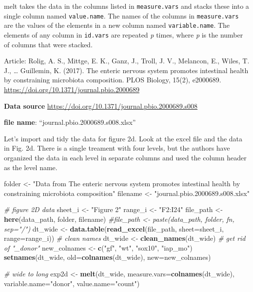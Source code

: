 \documentclass[]{book}
\newenvironment{Shaded}{\begin{snugshade}}{\end{snugshade}}
\newcommand{\KeywordTok}[1]{\textcolor[rgb]{0.13,0.29,0.53}{\textbf{#1}}}
\newcommand{\DataTypeTok}[1]{\textcolor[rgb]{0.13,0.29,0.53}{#1}}
\newcommand{\StringTok}[1]{\textcolor[rgb]{0.31,0.60,0.02}{#1}}
\newcommand{\CommentTok}[1]{\textcolor[rgb]{0.56,0.35,0.01}{\textit{#1}}}
\newcommand{\NormalTok}[1]{#1}
\begin{document}
melt takes the data in the columns listed in \texttt{measure.vars} and
stacks these into a single column named \texttt{value.name}. The names
of the columns in \texttt{measure.vars} are the values of the elements
in a new column named \texttt{variable.name}. The elements of any column
in \texttt{id.vars} are repeated \emph{p} times, where \emph{p} is the
number of columns that were stacked.

Article: Rolig, A. S., Mittge, E. K., Ganz, J., Troll, J. V., Melancon,
E., Wiles, T. J., \ldots{} Guillemin, K. (2017). The enteric nervous
system promotes intestinal health by constraining microbiota
composition. PLOS Biology, 15(2), e2000689.
\url{https://doi.org/10.1371/journal.pbio.2000689}

\textbf{Data source}
\url{https://doi.org/10.1371/journal.pbio.2000689.s008}

\textbf{file name}: ``journal.pbio.2000689.s008.xlsx''

Let's import and tidy the data for figure 2d. Look at the excel file and
the data in Fig. 2d. There is a single treament with four levels, but
the authors have organized the data in each level in separate columns
and used the column header as the level name.

\begin{Shaded}
\begin{Highlighting}[]
\NormalTok{folder <-}\StringTok{ "Data from The enteric nervous system promotes intestinal health by constraining microbiota composition"}
\NormalTok{filename <-}\StringTok{ "journal.pbio.2000689.s008.xlsx"}

\CommentTok{# figure 2D data}
\NormalTok{sheet_i <-}\StringTok{ "Figure 2"}
\NormalTok{range_i <-}\StringTok{ "F2:I24"}
\NormalTok{file_path <-}\StringTok{ }\KeywordTok{here}\NormalTok{(data_path, folder, filename)}
\CommentTok{#file_path <- paste(data_path, folder, fn, sep="/")}
\NormalTok{dt_wide <-}\StringTok{ }\KeywordTok{data.table}\NormalTok{(}\KeywordTok{read_excel}\NormalTok{(file_path, }\DataTypeTok{sheet=}\NormalTok{sheet_i, }\DataTypeTok{range=}\NormalTok{range_i))}
\CommentTok{# clean names}
\NormalTok{dt_wide <-}\StringTok{ }\KeywordTok{clean_names}\NormalTok{(dt_wide)}
\CommentTok{# get rid of "_donor"}
\NormalTok{new_colnames <-}\StringTok{ }\KeywordTok{c}\NormalTok{(}\StringTok{"gf"}\NormalTok{, }\StringTok{"wt"}\NormalTok{, }\StringTok{"sox10"}\NormalTok{, }\StringTok{"iap_mo"}\NormalTok{)}
\KeywordTok{setnames}\NormalTok{(dt_wide, }\DataTypeTok{old=}\KeywordTok{colnames}\NormalTok{(dt_wide), }\DataTypeTok{new=}\NormalTok{new_colnames)}

\CommentTok{# wide to long}
\NormalTok{exp2d <-}\StringTok{ }\KeywordTok{melt}\NormalTok{(dt_wide, }
              \DataTypeTok{measure.vars=}\KeywordTok{colnames}\NormalTok{(dt_wide), }
              \DataTypeTok{variable.name=}\StringTok{"donor"}\NormalTok{, }
              \DataTypeTok{value.name=}\StringTok{"count"}\NormalTok{)}
\end{Highlighting}
\end{Shaded}
\end{document}
